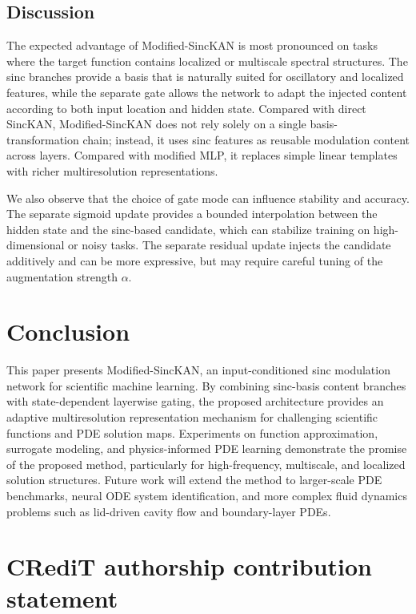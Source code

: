 \documentclass[preprint,12pt]{elsarticle}
\begin{document}
\subsection{Discussion}

The expected advantage of Modified-SincKAN is most pronounced on tasks where the target function contains localized or multiscale spectral structures. The sinc branches provide a basis that is naturally suited for oscillatory and localized features, while the separate gate allows the network to adapt the injected content according to both input location and hidden state. Compared with direct SincKAN, Modified-SincKAN does not rely solely on a single basis-transformation chain; instead, it uses sinc features as reusable modulation content across layers. Compared with modified MLP, it replaces simple linear templates with richer multiresolution representations.

We also observe that the choice of gate mode can influence stability and accuracy. The separate sigmoid update provides a bounded interpolation between the hidden state and the sinc-based candidate, which can stabilize training on high-dimensional or noisy tasks. The separate residual update injects the candidate additively and can be more expressive, but may require careful tuning of the augmentation strength \(\alpha\).

\section{Conclusion}

This paper presents Modified-SincKAN, an input-conditioned sinc modulation network for scientific machine learning. By combining sinc-basis content branches with state-dependent layerwise gating, the proposed architecture provides an adaptive multiresolution representation mechanism for challenging scientific functions and PDE solution maps. Experiments on function approximation, surrogate modeling, and physics-informed PDE learning demonstrate the promise of the proposed method, particularly for high-frequency, multiscale, and localized solution structures. Future work will extend the method to larger-scale PDE benchmarks, neural ODE system identification, and more complex fluid dynamics problems such as lid-driven cavity flow and boundary-layer PDEs.

\section*{CRediT authorship contribution statement}
\end{document}

